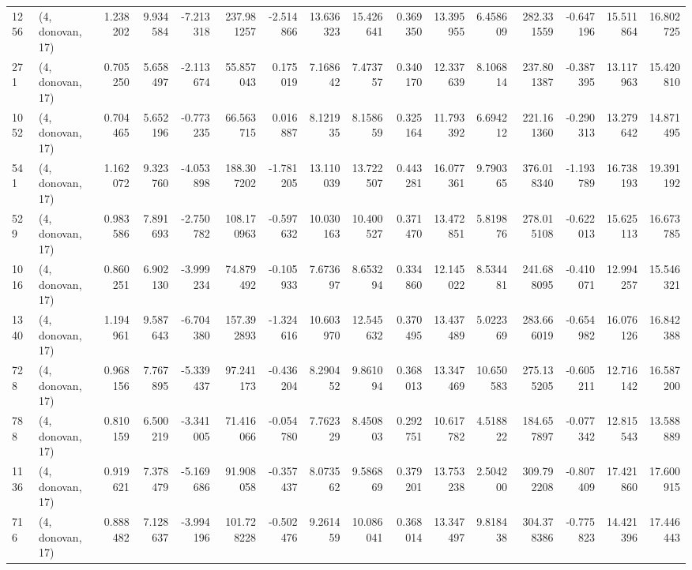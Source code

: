 \begin{tabular}{llrrrrrrrrrrrrrr}
1256 &  (4, donovan, 17) &   1.238202 &   9.934584 &  -7.213318 &    237.981257 &   -2.514866 &   13.636323 &   15.426641 &  0.369350 &  13.395955 &   6.458609 &   282.331559 &  -0.647196 &  15.511864 &  16.802725 \\
271  &  (4, donovan, 17) &   0.705250 &   5.658497 &  -2.113674 &     55.857043 &    0.175019 &    7.168642 &    7.473757 &  0.340170 &  12.337639 &   8.106814 &   237.801387 &  -0.387395 &  13.117963 &  15.420810 \\
1052 &  (4, donovan, 17) &   0.704465 &   5.652196 &  -0.773235 &     66.563715 &    0.016887 &    8.121935 &    8.158659 &  0.325164 &  11.793392 &   6.694212 &   221.161360 &  -0.290313 &  13.279642 &  14.871495 \\
541  &  (4, donovan, 17) &   1.162072 &   9.323760 &  -4.053898 &    188.307202 &   -1.781205 &   13.110039 &   13.722507 &  0.443281 &  16.077361 &   9.790365 &   376.018340 &  -1.193789 &  16.738193 &  19.391192 \\
529  &  (4, donovan, 17) &   0.983586 &   7.891693 &  -2.750782 &    108.170963 &   -0.597632 &   10.030163 &   10.400527 &  0.371470 &  13.472851 &   5.819876 &   278.015108 &  -0.622013 &  15.625113 &  16.673785 \\
1016 &  (4, donovan, 17) &   0.860251 &   6.902130 &  -3.999234 &     74.879492 &   -0.105933 &    7.673697 &    8.653294 &  0.334860 &  12.145022 &   8.534481 &   241.688095 &  -0.410071 &  12.994257 &  15.546321 \\
1340 &  (4, donovan, 17) &   1.194961 &   9.587643 &  -6.704380 &    157.392893 &   -1.324616 &   10.603970 &   12.545632 &  0.370495 &  13.437489 &   5.022369 &   283.666019 &  -0.654982 &  16.076126 &  16.842388 \\
728  &  (4, donovan, 17) &   0.968156 &   7.767895 &  -5.339437 &     97.241173 &   -0.436204 &    8.290452 &    9.861094 &  0.368013 &  13.347469 &  10.650583 &   275.135205 &  -0.605211 &  12.716142 &  16.587200 \\
788  &  (4, donovan, 17) &   0.810159 &   6.500219 &  -3.341005 &     71.416066 &   -0.054780 &    7.762329 &    8.450803 &  0.292751 &  10.617782 &   4.518822 &   184.657897 &  -0.077342 &  12.815543 &  13.588889 \\
1136 &  (4, donovan, 17) &   0.919621 &   7.378479 &  -5.169686 &     91.908058 &   -0.357437 &    8.073562 &    9.586869 &  0.379201 &  13.753238 &   2.504200 &   309.792208 &  -0.807409 &  17.421860 &  17.600915 \\
716  &  (4, donovan, 17) &   0.888482 &   7.128637 &  -3.994196 &    101.728228 &   -0.502476 &    9.261459 &   10.086041 &  0.368014 &  13.347497 &   9.818438 &   304.378386 &  -0.775823 &  14.421396 &  17.446443 \\

\end{tabular}
